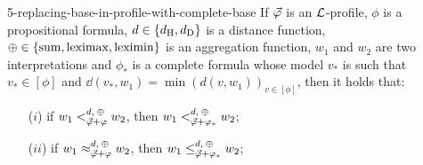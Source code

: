 \begin{lem}{}{5-replacing-base-in-profile-with-complete-base}
	If $\P$ is an $\L$-profile, 
	$\phi$ is a propositional formula, 
	$\dd\in\{\dd_\hamming,\dd_\drastic\}$ is a distance function,
	$\agg\in\{\ssum,\leximax,\leximin\}$ is an aggregation function,
	$w_1$ and $w_2$ are two interpretations and
	$\phi_\ast$ is a complete formula whose model $v_\ast$ is such that 
	$v_\ast\in[\phi]$ and $\dd(v_\ast,w_1)=\min(d(v,w_1))_{v\in[\phi]}$,
	then it holds that:
	\begin{itemize}
		\item[($i$)] if $w_1<^{\dd,\:\agg}_{\P+\phi}w_2$, then $w_1<^{\dd,\:\agg}_{\P+\phi_\ast}w_2$;
		\item[($ii$)] if $w_1\approx^{\dd,\:\agg}_{\P+\phi}w_2$, then $w_1\leq^{\dd,\:\agg}_{\P+\phi_\ast}w_2$;
	\end{itemize}	
\end{lem}
